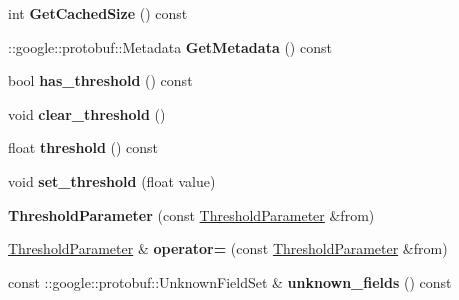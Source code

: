\begin{DoxyCompactItemize}
\item 
\mbox{\label{classcaffe_1_1_threshold_parameter_ac68b097998911b1426f4018441e3d126}} 
int {\bfseries Get\+Cached\+Size} () const
\item 
\mbox{\label{classcaffe_1_1_threshold_parameter_a59e1d1254b8635f0901354233f7119d6}} 
\+::google\+::protobuf\+::\+Metadata {\bfseries Get\+Metadata} () const
\item 
\mbox{\label{classcaffe_1_1_threshold_parameter_ad63a35c3a90064a79c36eee3d6c989a5}} 
bool {\bfseries has\+\_\+threshold} () const
\item 
\mbox{\label{classcaffe_1_1_threshold_parameter_aa5233c8d1eaf063532fa5eb89a5f9089}} 
void {\bfseries clear\+\_\+threshold} ()
\item 
\mbox{\label{classcaffe_1_1_threshold_parameter_af3378e286763921821acc6fdde65db8e}} 
float {\bfseries threshold} () const
\item 
\mbox{\label{classcaffe_1_1_threshold_parameter_aed8524f524c258017ba3f16f77bdf9f0}} 
void {\bfseries set\+\_\+threshold} (float value)
\item 
\mbox{\label{classcaffe_1_1_threshold_parameter_a44359cb1b2ed1e0e6ee5103d7edb6b65}} 
{\bfseries Threshold\+Parameter} (const \mbox{\hyperlink{classcaffe_1_1_threshold_parameter}{Threshold\+Parameter}} \&from)
\item 
\mbox{\label{classcaffe_1_1_threshold_parameter_a1dbdd6ea552168143b43f380c22c3f9d}} 
\mbox{\hyperlink{classcaffe_1_1_threshold_parameter}{Threshold\+Parameter}} \& {\bfseries operator=} (const \mbox{\hyperlink{classcaffe_1_1_threshold_parameter}{Threshold\+Parameter}} \&from)
\item 
\mbox{\label{classcaffe_1_1_threshold_parameter_af8a41b3d0ef47377216d6a14645c0e50}} 
const \+::google\+::protobuf\+::\+Unknown\+Field\+Set \& {\bfseries unknown\+\_\+fields} () const

\end{DoxyCompactItemize}
